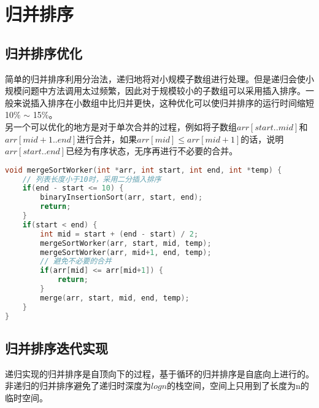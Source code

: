 \newpage

\section{归并排序}

\subsection{归并排序优化}

简单的归并排序利用分治法，递归地将对小规模子数组进行处理。但是递归会使小规模问题中方法调用太过频繁，因此对于规模较小的子数组可以采用插入排序。一般来说插入排序在小数组中比归并更快，这种优化可以使归并排序的运行时间缩短10\% $ \sim $ 15\%。 \\

另一个可以优化的地方是对于单次合并的过程，例如将子数组$ arr[start..mid] $和$ arr[mid+1..end] $进行合并，如果$ arr[mid] \le arr[mid+1] $的话，说明$ arr[start..end] $已经为有序状态，无序再进行不必要的合并。 \\


\begin{lstlisting}[language=C]
void mergeSortWorker(int *arr, int start, int end, int *temp) {
    // 列表长度小于10时，采用二分插入排序
    if(end - start <= 10) {
        binaryInsertionSort(arr, start, end);
        return;
    }
    if(start < end) {
        int mid = start + (end - start) / 2;
        mergeSortWorker(arr, start, mid, temp);
        mergeSortWorker(arr, mid+1, end, temp);
        // 避免不必要的合并
        if(arr[mid] <= arr[mid+1]) {
            return;
        }
        merge(arr, start, mid, end, temp);
    }
}
\end{lstlisting}

\subsection{归并排序迭代实现}

递归实现的归并排序是自顶向下的过程，基于循环的归并排序是自底向上进行的。非递归的归并排序避免了递归时深度为$ logn $的栈空间，空间上只用到了长度为n的临时空间。 \\


